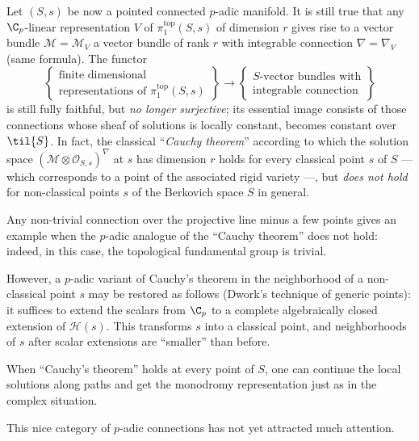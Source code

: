 \begin{para}
 Let $(S,s)$ be now a pointed connected $p$-adic manifold. It is still
 true that any $\C_p$-linear representation $V$ of
 $\pi_1^{\mathrm{top}}(S,s)$ of dimension $r$ gives rise to a vector
 bundle $\mathcal{M}=\mathcal{M}_V$ a vector bundle of rank $r$ with
 integrable connection $\nabla =\nabla_V$ (same formula).
 The functor
 \begin{equation*}
  \left\{
  \begin{matrix}
   \text{finite dimensional}\\
   \text{representations of $\pi_1^{\mathrm{top}}(S,s)$}
  \end{matrix}
  \right\}
  \rightarrow
  \left\{
  \begin{matrix}
   \text{$S$-vector bundles with}\\
   \text{integrable connection}
  \end{matrix}
  \right\}
 \end{equation*}
 is still fully faithful, but \emph{no longer surjective}; its essential
 image consists of those connections whose sheaf of solutions is locally
 constant, \ie  becomes constant over $\til{S}$.  In fact, the
 classical ``\emph{Cauchy theorem}'' according to which the solution
 space $(\mathcal{M}\otimes\mathcal{O}_{S,s})^{\nabla}$ at $s$ has
 dimension $r$ holds for every classical point $s$ of $S$ --- which
 corresponds to a point of the associated rigid variety ---, but
 \emph{does not hold} for non-classical points $s$ of the Berkovich
 space $S$ in general.
\end{para}

\begin{para}\label{para-cauchy} 
 Any non-trivial connection over the projective line minus a few points
 gives an example when the $p$-adic analogue of the ``Cauchy theorem''
 does not hold: indeed, in this case, the topological fundamental group
 is trivial.  

 However, a $p$-adic variant of Cauchy's theorem in the neighborhood of a
 non-classical point $s$ may be restored as follows (Dwork's technique of
 generic points): it suffices to extend the scalars from $\C_p$
 to a complete algebraically closed extension of $\mathscr{H}(s)$.  This
 transforms $s$ into a classical point, and neighborhoods of $s$ after
 scalar extensions are ``smaller'' than before.
\end{para}

\begin{para}\label{para-cauchy-monodromy} 
 When ``Cauchy's theorem'' holds at every point of $S$, one can continue
 the local solutions along paths and get the monodromy representation
 just as in the complex situation. 

 This nice category of $p$-adic connections has not yet
 attracted much attention.
\end{para}

